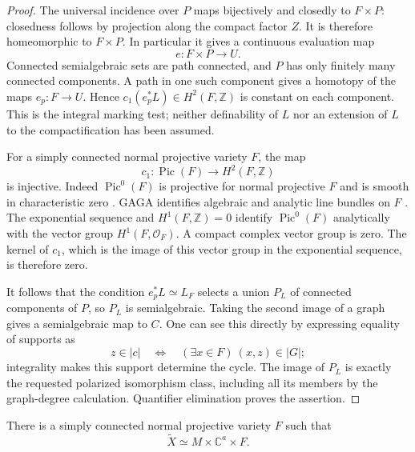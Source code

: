 \begin{proof}
The universal incidence over $P$ maps bijectively and closedly to $F\times P$: closedness follows by projection along the compact factor $Z$.  It is therefore homeomorphic to $F\times P$.  In particular it gives a continuous evaluation map
\[
                         e:F\times P\longrightarrow U.
\]
Connected semialgebraic sets are path connected, and $P$ has only finitely many connected components.  A path in one such component gives a homotopy of the maps $e_p:F\to U$.  Hence $c_1(e_p^*L)\in H^2(F,\mathbb{Z})$ is constant on each component. This is the integral marking test; neither definability of $L$ nor an extension of $L$ to the compactification has been assumed.

For a simply connected normal projective variety $F$, the map
\[
             c_1:\operatorname{Pic}(F)\longrightarrow H^2(F,\mathbb{Z})
\]
is injective.  Indeed $\operatorname{Pic}^0(F)$ is projective for normal projective $F$ and is smooth in characteristic zero \cite[Theorem~5.4 and Remark~5.6]{Kleiman2005}.  GAGA identifies algebraic and analytic line bundles on $F$ \cite[Proposition~18]{Serre1956}. The exponential sequence and $H^1(F,\mathbb{Z})=0$ identify $\operatorname{Pic}^0(F)$ analytically with the vector group $H^1(F,\mathcal{O}_F)$.  A compact complex vector group is zero.  The kernel of $c_1$, which is the image of this vector group in the exponential sequence, is therefore zero.

It follows that the condition $e_p^*L\simeq L_F$ selects a union $P_L$ of connected components of $P$, so $P_L$ is semialgebraic. Taking the second image of a graph gives a semialgebraic map to $C$. One can see this directly by expressing equality of supports as
\[
 z\in|c|\quad\Longleftrightarrow\quad
              (\exists x\in F)\ (x,z)\in|G|;
\]
integrality makes this support determine the cycle.  The image of $P_L$ is exactly the requested polarized isomorphism class, including all its members by the graph-degree calculation.  Quantifier elimination proves the assertion.
\end{proof}

\begin{proposition}
\label{prop:cmp-product}
There is a simply connected normal projective variety $F$ such that
\[
                    \widetilde X\simeq M\times\mathbb{C}^a\times F.
\]
\end{proposition}

